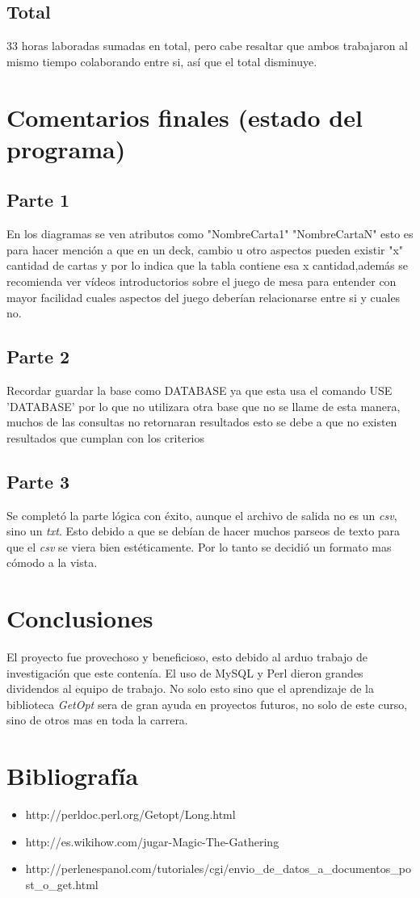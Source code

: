 \documentclass{article}
\begin{document}
\subsection{Total}
33 horas laboradas sumadas en total, pero cabe resaltar que ambos trabajaron al mismo tiempo colaborando entre si, así que el total disminuye.

\section{Comentarios finales (estado del programa)}
\subsection{Parte 1}
En los diagramas se ven atributos como "NombreCarta1" "NombreCartaN" esto es para hacer mención a que en un deck, cambio u otro aspectos pueden existir "x" cantidad de cartas y por lo indica que la tabla contiene esa x cantidad,además se recomienda ver vídeos introductorios sobre el juego de mesa para entender con mayor facilidad cuales aspectos del juego deberían relacionarse entre si y cuales no.

\subsection{Parte 2}
Recordar guardar la base como DATABASE ya que esta usa el comando USE 'DATABASE' por lo que no utilizara otra base que no se llame de esta manera, muchos de las consultas no retornaran resultados esto se debe a que no existen resultados que cumplan con los criterios


\subsection{Parte 3}
Se completó la parte lógica con éxito, aunque el archivo de salida no es un \textit{csv}, sino un \textit{txt}. Esto debido a que se debían de hacer muchos parseos de texto para que el \textit{csv} se viera bien estéticamente. Por lo tanto se decidió un formato mas cómodo a la vista. 

\section{Conclusiones}
El proyecto fue provechoso y beneficioso, esto debido al arduo trabajo de investigación que este contenía. El uso de MySQL y Perl dieron grandes dividendos al equipo de trabajo. No solo esto sino que el aprendizaje de la biblioteca \textit{GetOpt} sera de gran ayuda en proyectos futuros, no solo de este curso, sino de otros mas en toda la carrera. 

\section{Bibliografía}

\begin{itemize}
       
    \item http://perldoc.perl.org/Getopt/Long.html
    
    \item http://es.wikihow.com/jugar-Magic-The-Gathering

    \item http://perlenespanol.com/tutoriales/cgi/envio_de_datos_a_documentos_post_o_get.html
    
\end{itemize}
\end{document}
